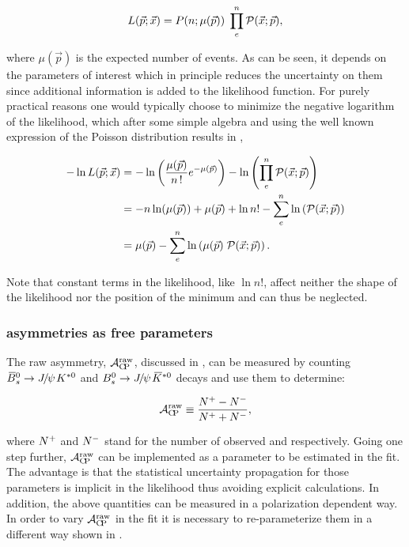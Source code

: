 \begin{equation}
  \centering
L(\vec{p};\vec{x}) = P(n;\expEvnts) \; \prod_e^n \mathcal{P}(\vec{x};\vec{p}),
\label{extlikelihood}
\end{equation}

\noindent where $\mu(\vec{p})$ is the expected number of events. As can be seen, it depends on the parameters of interest which in
principle reduces the uncertainty on them since additional information is added to the likelihood function.
For purely practical reasons one would typically choose to minimize the negative logarithm of the likelihood, which after some simple
algebra and using the well known expression of the Poisson distribution results in ,

\begin{align}
  \centering
  -\nll &= -\ln\left( \frac{\expEvnts}{n\,!} e^{-\expEvnts } \right) - \ln\left( \prod_e^n \mathcal{P}(\vec{x};\vec{p}) \right)  \nonumber \\
        &= - n\ln(\expEvnts) + \expEvnts  + \ln n! - \sum_e^n \ln\parenthesis{\mathcal{P}(\vec{x};\vec{p})} \nonumber \\
        &=  \expEvnts  - \sum_e^n \ln\parenthesis{\expEvnts \; \mathcal{P}(\vec{x};\vec{p}) }.
\label{extloglikelihood}
\end{align}

\noindent Note that constant terms in the likelihood, like $\ln n!$, affect neither the shape of the likelihood nor the position of the minimum
and can thus be neglected.

\subsubsection{\CP asymmetries as free parameters}
\label{cp_assymetries_and_total_decay_rate}
The raw asymmetry, $\mathcal{A}_{\rm C\!P}^{\rm raw}$, discussed in , can be measured by counting
$\BsbarJpsiKst$ and $\BsJpsiKst$ decays and use them to determine:

\begin{equation}
\mathcal{A}_{\rm C\!P}^{\text{raw}} \equiv \frac{{N^+} - {N^-}}{{N^+} + {N^-}},
\label{acp_mes}
\end{equation}

\noindent where ${N^+}$ and ${N^-}$ stand for the number of observed \BsbarJpsiKst and \BsJpsiKst respectively.
Going one step further, $\mathcal{A}_{\rm C\!P}^{\text{raw}}$ can be implemented as a parameter to be estimated in the fit. The advantage
is that the statistical uncertainty propagation for those parameters is implicit in the likelihood thus avoiding
explicit calculations. In addition, the above quantities can be measured in a polarization dependent way. In order
to vary $\mathcal{A}_{\rm C\!P}^{\text{raw}}$ in the fit it is necessary to re-parameterize them in a different way shown in .

